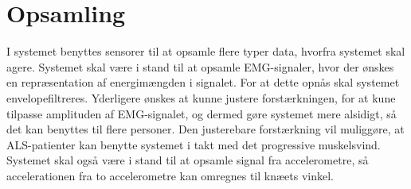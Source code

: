 \section{Opsamling} \label{sec:sensorer}
I systemet benyttes sensorer til at opsamle flere typer data, hvorfra systemet skal agere. Systemet skal være i stand til at opsamle EMG-signaler, hvor der ønskes en repræsentation af energimængden i signalet. For at dette opnås skal systemet envelopefiltreres. Yderligere ønskes at kunne justere forstærkningen, for at kune tilpasse amplituden af EMG-signalet, og dermed gøre systemet mere alsidigt, så det kan benyttes til flere personer. Den justerebare forstærkning vil muliggøre, at ALS-patienter kan benytte systemet i takt med det progressive muskelsvind.
Systemet skal også være i stand til at opsamle signal fra accelerometre, så accelerationen fra to accelerometre kan omregnes til knæets vinkel. 